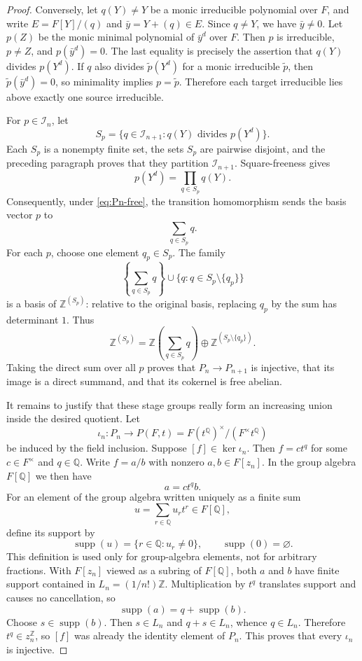 \documentclass[10pt,a4paper]{amsart}
\newcommand{\Q}{\mathbb Q}
\newcommand{\Z}{\mathbb Z}
\begin{document}
\begin{proof}
Conversely, let $q(Y)\neq Y$ be a monic irreducible polynomial over $F$,
and write $E=F[Y]/(q)$ and $\bar y=Y+(q)\in E$.  Since $q\neq Y$, we have
$\bar y\neq0$.  Let $p(Z)$ be the monic minimal polynomial of $\bar y^d$
over $F$.  Then $p$ is irreducible, $p\neq Z$, and
$p(\bar y^d)=0$.  The last equality is precisely the assertion that
$q(Y)$ divides $p(Y^d)$.  If $q$ also divides $\widetilde p(Y^d)$ for a
monic irreducible $\widetilde p$, then
$\widetilde p(\bar y^d)=0$, so minimality implies
$p=\widetilde p$.  Therefore each target irreducible lies above exactly one
source irreducible.

For $p\in\mathcal I_n$, let
\[
  S_p=\{q\in\mathcal I_{n+1}:q(Y)\text{ divides }p(Y^d)\}.
\]
Each $S_p$ is a nonempty finite set, the sets $S_p$ are pairwise disjoint,
and the preceding paragraph proves that they partition
$\mathcal I_{n+1}$.  Square-freeness gives
\[
  p(Y^d)=\prod_{q\in S_p}q(Y).
\]
Consequently, under \cref{eq:Pn-free}, the transition homomorphism sends
the basis vector $p$ to
\begin{equation}\label{eq:transition-vector}
  \sum_{q\in S_p}q.
\end{equation}
For each $p$, choose one element $q_p\in S_p$.  The family
\[
  \left\{\sum_{q\in S_p}q\right\}
  \cup\{q:q\in S_p\setminus\{q_p\}\}
\]
is a basis of $\Z^{(S_p)}$: relative to the original basis, replacing
$q_p$ by the sum has determinant $1$.  Thus
\[
  \Z^{(S_p)}=
  \Z\left(\sum_{q\in S_p}q\right)
  \oplus\Z^{(S_p\setminus\{q_p\})}.
\]
Taking the direct sum over all $p$ proves that
$P_n\to P_{n+1}$ is injective, that its image is a direct summand, and that
its cokernel is free abelian.

It remains to justify that these stage groups really form an increasing
union inside the desired quotient.  Let
\[
  \iota_n:P_n\longrightarrow
  P(F,t)=F(t^\Q)^\times/(F^\times t^\Q)
\]
be induced by the field inclusion.  Suppose $[f]\in\ker\iota_n$.  Then
$f=c t^q$ for some $c\in F^\times$ and $q\in\Q$.  Write
$f=a/b$ with nonzero $a,b\in F[z_n]$.  In the group algebra $F[\Q]$ we
then have
\begin{equation}\label{eq:support-translation-puiseux}
  a=c t^q b.
\end{equation}
For an element of the group algebra written uniquely as a finite sum
\[
  u=\sum_{r\in\Q}u_r t^r\in F[\Q],
\]
define its support by
\[
  \operatorname{supp}(u)=\{r\in\Q:u_r\neq0\},
  \qquad \operatorname{supp}(0)=\varnothing.
\]
This definition is used only for group-algebra elements, not for arbitrary
fractions.  With $F[z_n]$ viewed as a subring of $F[\Q]$, both $a$ and $b$
have finite support contained in
$L_n=(1/n!)\Z$.  Multiplication by $t^q$ translates support and causes no
cancellation, so
\[
  \operatorname{supp}(a)=q+\operatorname{supp}(b).
\]
Choose $s\in\operatorname{supp}(b)$.  Then $s\in L_n$ and
$q+s\in L_n$, whence $q\in L_n$.  Therefore $t^q\in z_n^\Z$, so $[f]$ was
already the identity element of $P_n$.  This proves that every $\iota_n$
is injective.


\end{proof}
\end{document}
